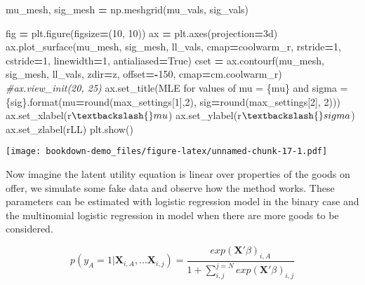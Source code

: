 \documentclass[
]{book}
\newenvironment{Shaded}{\begin{snugshade}}{\end{snugshade}}
\newcommand{\BuiltInTok}[1]{#1}
\newcommand{\CommentTok}[1]{\textcolor[rgb]{0.56,0.35,0.01}{\textit{#1}}}
\newcommand{\DecValTok}[1]{\textcolor[rgb]{0.00,0.00,0.81}{#1}}
\newcommand{\NormalTok}[1]{#1}
\newcommand{\OperatorTok}[1]{\textcolor[rgb]{0.81,0.36,0.00}{\textbf{#1}}}
\newcommand{\SpecialCharTok}[1]{\textcolor[rgb]{0.00,0.00,0.00}{#1}}
\newcommand{\StringTok}[1]{\textcolor[rgb]{0.31,0.60,0.02}{#1}}
\newcommand{\VariableTok}[1]{\textcolor[rgb]{0.00,0.00,0.00}{#1}}
\newcommand{\VerbatimStringTok}[1]{\textcolor[rgb]{0.31,0.60,0.02}{#1}}
\theoremstyle{definition}
\theoremstyle{definition}
\theoremstyle{definition}
\theoremstyle{remark}
\begin{document}
\begin{Shaded}
\begin{Highlighting}[]
\NormalTok{mu\_mesh, sig\_mesh }\OperatorTok{=}\NormalTok{ np.meshgrid(mu\_vals, sig\_vals)}

\NormalTok{fig }\OperatorTok{=}\NormalTok{ plt.figure(figsize}\OperatorTok{=}\NormalTok{(}\DecValTok{10}\NormalTok{, }\DecValTok{10}\NormalTok{))}
\NormalTok{ax }\OperatorTok{=}\NormalTok{ plt.axes(projection}\OperatorTok{=}\StringTok{\textquotesingle{}3d\textquotesingle{}}\NormalTok{)}
\NormalTok{ax.plot\_surface(mu\_mesh, sig\_mesh, ll\_vals, cmap}\OperatorTok{=}\StringTok{\textquotesingle{}coolwarm\_r\textquotesingle{}}\NormalTok{, rstride}\OperatorTok{=}\DecValTok{1}\NormalTok{, cstride}\OperatorTok{=}\DecValTok{1}\NormalTok{, linewidth}\OperatorTok{=}\DecValTok{1}\NormalTok{, antialiased}\OperatorTok{=}\VariableTok{True}\NormalTok{)}
\NormalTok{cset }\OperatorTok{=}\NormalTok{ ax.contourf(mu\_mesh, sig\_mesh, ll\_vals, zdir}\OperatorTok{=}\StringTok{\textquotesingle{}z\textquotesingle{}}\NormalTok{, offset}\OperatorTok{={-}}\DecValTok{150}\NormalTok{, cmap}\OperatorTok{=}\NormalTok{cm.coolwarm\_r)}
\CommentTok{\#ax.view\_init(20, 25)}
\NormalTok{ax.set\_title(}\StringTok{\textquotesingle{}MLE for values of mu = }\SpecialCharTok{\{mu\}}\StringTok{ and sigma = }\SpecialCharTok{\{sig\}}\StringTok{\textquotesingle{}}\NormalTok{.}\BuiltInTok{format}\NormalTok{(mu}\OperatorTok{=}\BuiltInTok{round}\NormalTok{(max\_settings[}\DecValTok{1}\NormalTok{],}\DecValTok{2}\NormalTok{), sig}\OperatorTok{=}\BuiltInTok{round}\NormalTok{(max\_settings[}\DecValTok{2}\NormalTok{], }\DecValTok{2}\NormalTok{)))}
\NormalTok{ax.set\_xlabel(}\VerbatimStringTok{r\textquotesingle{}$\textbackslash{}mu$\textquotesingle{}}\NormalTok{)}
\NormalTok{ax.set\_ylabel(}\VerbatimStringTok{r\textquotesingle{}$\textbackslash{}sigma$\textquotesingle{}}\NormalTok{)}
\NormalTok{ax.set\_zlabel(}\VerbatimStringTok{r\textquotesingle{}LL\textquotesingle{}}\NormalTok{)}
\NormalTok{plt.show()}
\end{Highlighting}
\end{Shaded}

\texttt{[image: bookdown-demo\_files/figure-latex/unnamed-chunk-17-1.pdf]}

Now imagine the latent utility equation is linear over properties of the goods on offer, we simulate some fake data and observe how the method works.
These parameters can be estimated with logistic regression model in the binary case and the multinomial logistic regression in model when there are more goods to be considered.

\[ p(y_A = 1 | \mathbf{X}_{i, A}, ...  \mathbf{X}_{i, j}) = \frac{ exp(\mathbf{X'}\beta)_{i, A}}{1 + \sum_{i, j}^{j=N} exp(\mathbf{X'}\beta)_{i, j} }  \]
\end{document}
